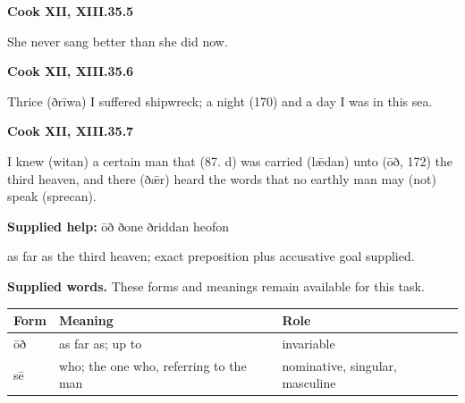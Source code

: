 \par\begin{minipage}{\linewidth}\raggedright
\textbf{Cook XII, XIII.35.5}

She never sang better than she did now.

\end{minipage}\par\addvspace{4pt}

\par\begin{minipage}{\linewidth}\raggedright
\textbf{Cook XII, XIII.35.6}

Thrice (ðrīwa) I suffered shipwreck; a night (170) and a day I was in this sea.

\end{minipage}\par\addvspace{4pt}

\par\begin{minipage}{\linewidth}\raggedright
\textbf{Cook XII, XIII.35.7}

I knew (witan) a certain man that (87. d) was carried (lǣdan) unto (ōð, 172) the third heaven, and there (ðǣr) heard the words that no earthly man may (not) speak (sprecan).

\textbf{Supplied help:} ōð ðone ðriddan heofon

as far as the third heaven; exact preposition plus accusative goal supplied.

\end{minipage}\par\addvspace{4pt}

\textbf{Supplied words.} These forms and meanings remain available for this task.

\par\begingroup
\fontsize{10.5}{13.2}\selectfont
\setlength{\LTleft}{0pt}\setlength{\LTright}{\fill}
\noindent
\begin{tabular}{@{}>{\raggedright\arraybackslash}p{22.74mm}>{\raggedright\arraybackslash}p{50.15mm}>{\raggedright\arraybackslash}p{45.49mm}@{}}
\toprule
\textbf{Form} & \textbf{Meaning} & \textbf{Role} \\
\midrule
ōð & as far as; up to & invariable \\
sē & who; the one who, referring to the man & nominative, singular, masculine \\
\bottomrule
\end{tabular}
\par\endgroup

